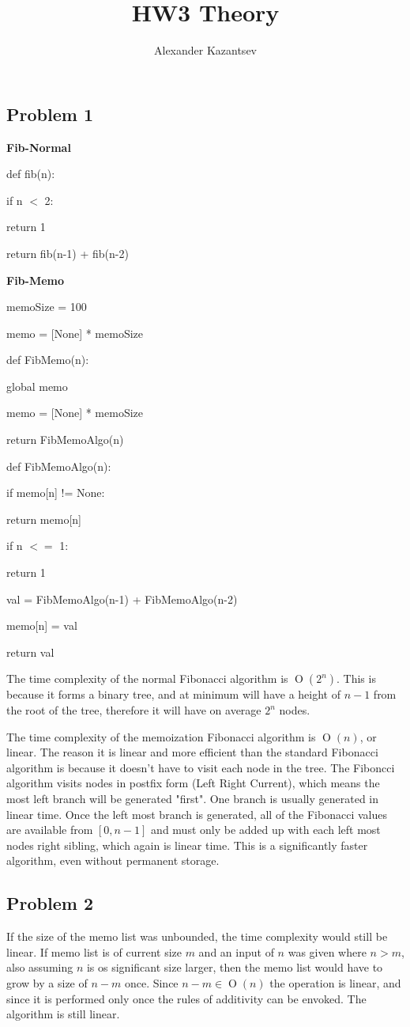 \documentclass[10pt,letterpaper,oneside]{article}
\title{HW3 Theory}
\author{Alexander Kazantsev}
\newcommand{\Problem}[1]{\subsection*{Problem #1}}
\DeclareMathOperator{\Omicron}{O}
\newcommand{\BigOh}[1]{\Omicron(#1)}
\newcommand\tab[1][1cm]{\hspace*{#1}}
\begin{document}
\maketitle

\Problem{1}

\textbf{Fib-Normal}

def fib(n):

	\tab if n $<$ 2:

	\tab\tab	return 1

	\tab return fib(n-1) + fib(n-2)

\textbf{Fib-Memo}

memoSize = 100

memo = [None] * memoSize 

def FibMemo(n):

	\tab global memo

	\tab memo = [None] * memoSize

	\tab return FibMemoAlgo(n)


def FibMemoAlgo(n):

	\tab if memo[n] != None:

		\tab\tab return memo[n]

	\tab if n $<=$ 1:

	\tab\tab	return 1

	\tab val = FibMemoAlgo(n-1) + FibMemoAlgo(n-2)

	\tab memo[n] = val

	\tab return val

The time complexity of the normal Fibonacci algorithm is $\BigOh{2^n}$. This is because it forms a binary tree, and at minimum will have a height of $n-1$ from the root of the tree, therefore it will have on average $2^n$ nodes. 

The time complexity of the memoization Fibonacci algorithm is $\BigOh{n}$, or linear. The reason it is linear and more efficient than the standard Fibonacci algorithm is because it doesn't have to visit each node in the tree. The Fiboncci algorithm visits nodes in postfix form (Left Right Current), which means the most left branch will be generated "first". One branch is usually generated in linear time. Once the left most branch is generated, all of the Fibonacci values are available from $[0,n-1]$ and must only be added up with each left most nodes right sibling, which again is linear time. This is a significantly faster algorithm, even without permanent storage.    

\Problem{2}
If the size of the memo list was unbounded, the time complexity would still be linear. If memo list is of current size $m$ and an input of $n$ was given where $n>m$, also assuming $n$ is os significant size larger, then the memo list would have to grow by a size of $n-m$ once. Since $n-m \in \BigOh{n}$ the operation is linear, and since it is performed only once the rules of additivity can be envoked. The algorithm is still linear.
\end{document}
